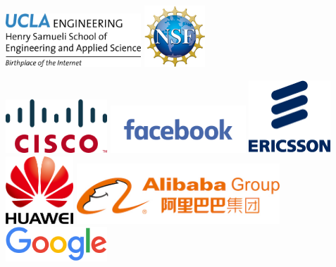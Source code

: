 \documentclass[12pt]{article}
\begin{document}
\begin{center}

\includegraphics[width=2in]{ucla-hsseas.jpg}
\hspace{1in}
\includegraphics[width=0.9in]{nsf.jpg}

\hspace{0.2in}
\includegraphics[width=1.5in]{cisco.png}
\hspace{0.2in}
\includegraphics[width=2in]{facebook.png}
\hspace{0.2in}
\includegraphics[width=1.2in]{ericsson.png}
\\[0.5cm]

\hspace{0.2in}
\includegraphics[width=1in]{huawei.png}
\hspace{0.2in}
\includegraphics[width=3in]{alibaba.jpg}
\hspace{0.2in}
\includegraphics[width=1.5in]{google.png}
\\[0.5cm]


\end{center}
\end{document}
